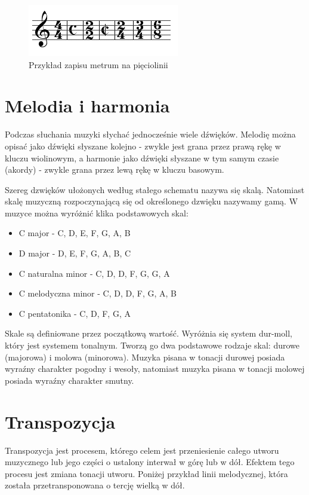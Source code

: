\documentclass[]{book}
\theoremstyle{definition}
\begin{document}
\begin{appendices}
\begin{figure}[H]
	\centering
	\includegraphics[width=0.4\linewidth]{takt}
	\caption{Przykład zapisu metrum na pięciolinii}
	\label{fig:takt}
\end{figure}



		
	\section{Melodia i harmonia}
	Podczas słuchania muzyki słychać jednocześnie wiele dźwięków. Melodię można opisać jako dźwięki słyszane kolejno - zwykle jest grana przez prawą rękę w kluczu wiolinowym, a harmonie jako dźwięki słyszane w tym samym czasie (akordy) - zwykle grana przez lewą rękę w kluczu basowym.
	
	Szereg dzwięków ułożonych według stałego schematu nazywa się skalą. Natomiast skalę muzyczną rozpoczynającą się od określonego dzwięku nazywamy gamą. W muzyce można wyróżnić klika podstawowych skal:
	
	\begin{itemize}
		\item C major - C, D, E, F, G, A, B
		\item D major - D, E, F\musSharp, G, A, B, C\musSharp
		\item C naturalna minor - C, D, D\musSharp, F, G, G\musSharp, A\musSharp
		\item C melodyczna minor - C, D, D\musSharp, F, G, A, B
		\item C pentatonika - C, D, F, G, A
	\end{itemize}  

	Skale są definiowane przez początkową wartość. Wyróżnia się system dur-moll, który jest systemem tonalnym. Tworzą go dwa podstawowe rodzaje skal: durowe (majorowa) i molowa (minorowa). Muzyka pisana w tonacji durowej posiada wyraźny charakter pogodny i wesoły, natomiast muzyka pisana w tonacji molowej posiada wyraźny charakter smutny.  
	
	
	
	\section{Transpozycja}
	
	Transpozycja jest procesem, którego celem jest przeniesienie całego utworu muzycznego lub jego części o ustalony interwał w górę lub w dół. Efektem tego procesu jest zmiana tonacji utworu. Poniżej przykład linii melodycznej, która została przetransponowana o tercję wielką w dół. 
	

\end{appendices}
\end{document}
